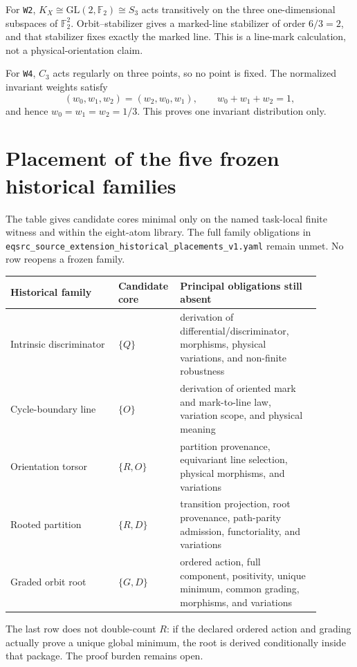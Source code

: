 \documentclass[11pt]{article}
\begin{document}
For \texttt{W2}, \(K_X\cong\mathrm{GL}(2,\mathbb F_2)\cong S_3\) acts
transitively on the three one-dimensional subspaces of \(\mathbb F_2^2\).
Orbit--stabilizer gives a marked-line stabilizer of order \(6/3=2\), and that
stabilizer fixes exactly the marked line.  This is a line-mark calculation,
not a physical-orientation claim.

For \texttt{W4}, \(C_3\) acts regularly on three points, so no point is fixed.
The normalized invariant weights satisfy
\[
 (w_0,w_1,w_2)=(w_2,w_0,w_1),\qquad
 w_0+w_1+w_2=1,
\]
and hence \(w_0=w_1=w_2=1/3\).  This proves one invariant distribution only.

\section{Placement of the five frozen historical families}

The table gives candidate cores minimal only on the named task-local finite
witness and within the eight-atom library.  The full family obligations in
\texttt{eqsrc\_source\_extension\_historical\_placements\_v1.yaml} remain
unmet.  No row reopens a frozen family.

\begin{longtable}{>{\raggedright\arraybackslash}p{0.33\linewidth}
                  >{\raggedright\arraybackslash}p{0.13\linewidth}
                  >{\raggedright\arraybackslash}p{0.43\linewidth}}
\toprule
Historical family & Candidate core & Principal obligations still absent\\
\midrule
\endhead
Intrinsic discriminator & \(\{Q\}\)
& derivation of differential/discriminator, morphisms, physical variations, and non-finite robustness\\
Cycle-boundary line & \(\{O\}\)
& derivation of oriented mark and mark-to-line law, variation scope, and physical meaning\\
Orientation torsor & \(\{R,O\}\)
& partition provenance, equivariant line selection, physical morphisms, and variations\\
Rooted partition & \(\{R,D\}\)
& transition projection, root provenance, path-parity admission, functoriality, and variations\\
Graded orbit root & \(\{G,D\}\)
& ordered action, full component, positivity, unique minimum, common grading, morphisms, and variations\\
\bottomrule
\end{longtable}

The last row does not double-count \(R\): if the declared ordered action and
grading actually prove a unique global minimum, the root is derived
conditionally inside that package.  The proof burden remains open.
\end{document}
